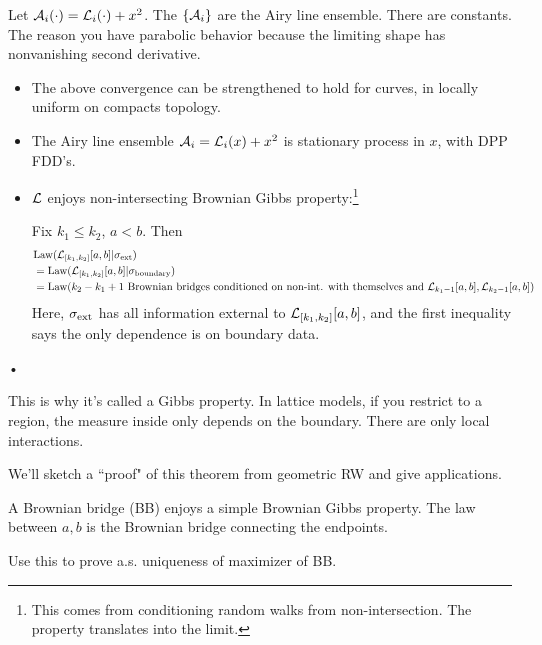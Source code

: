 Let $\cal A_i(\cdot)=\cL_i(\cdot)+x^2$. The $\{\cal A_i\}$ are the Airy line ensemble. %
There are constants. %
The reason you have parabolic behavior because the limiting shape has nonvanishing second derivative.

\begin{thm}
\begin{itemize}
\item
The above convergence can be strengthened to hold for curves, in locally uniform on compacts topology.
\item
The Airy line ensemble 
$\cal A_i=\cL_i(x)+x^2$ is stationary process in $x$, with DPP FDD's.
\item
$\cL$ enjoys non-intersecting Brownian Gibbs property:\footnote{This comes from conditioning random walks from non-intersection. The property translates into the limit.} %

Fix $k_1\le k_2$, $a<b$. Then 
\begin{align*}
&\text{Law}(\cL_{[k_1,k_2]}[a,b]|\si_{\text{ext}})\\
&= \text{Law}(\cL_{[k_1,k_2]}[a,b]|\si_{\text{boundary}})\\
&= \text{Law}(k_2-k_1+1\text{ Brownian bridges conditioned on non-int. with themselves and }\cL_{k_1-1}[a,b],\cL_{k_2-1}[a,b])
\end{align*}
Here, $\si_{\text{ext}}$ has all information external to $\cL_{[k_1,k_2]}[a,b]$, and the first inequality says the only dependence is on boundary data.
\end{itemize}•
\end{thm}
This is why it's called a Gibbs property. In lattice models, if you restrict to a region, the measure inside only depends on the boundary. There are only local interactions.


We'll sketch a ``proof" of this theorem from geometric RW and give applications.

\begin{exr}
A Brownian bridge (BB) enjoys a simple Brownian Gibbs property. The law between $a,b$ is the Brownian bridge connecting the endpoints.

Use this to prove a.s. uniqueness of maximizer of BB.
\end{exr}

